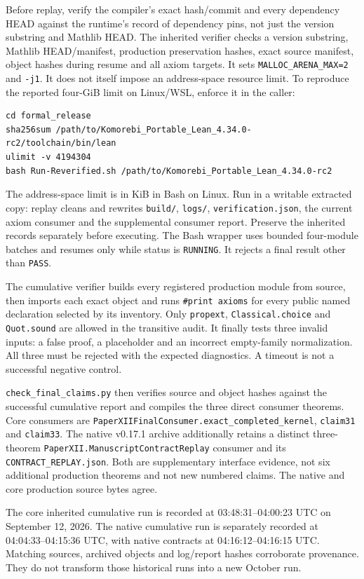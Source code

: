 \documentclass[11pt]{article}
\newcommand{\code}[1]{\nolinkurl{#1}}
\begin{document}
Before replay, verify the compiler's exact hash/commit and every dependency HEAD against the runtime's record of dependency pins, not just the version substring and Mathlib HEAD. The inherited verifier checks a version substring, Mathlib HEAD/manifest, production preservation hashes, exact source manifest, object hashes during resume and all axiom targets. It sets \code{MALLOC_ARENA_MAX=2} and \code{-j1}. It does not itself impose an address-space resource limit. To reproduce the reported four-GiB limit on Linux/WSL, enforce it in the caller:
\begin{Verbatim}[fontsize=\small,breaklines=true,breakanywhere=true,frame=lines]
cd formal_release
sha256sum /path/to/Komorebi_Portable_Lean_4.34.0-rc2/toolchain/bin/lean
ulimit -v 4194304
bash Run-Reverified.sh /path/to/Komorebi_Portable_Lean_4.34.0-rc2
\end{Verbatim}
The address-space limit is in KiB in Bash on Linux. Run in a writable extracted copy: replay cleans and rewrites \code{build/}, \code{logs/}, \code{verification.json}, the current axiom consumer and the supplemental consumer report. Preserve the inherited records separately before executing. The Bash wrapper uses bounded four-module batches and resumes only while status is \code{RUNNING}. It rejects a final result other than \code{PASS}.

The cumulative verifier builds every registered production module from source, then imports each exact object and runs \texttt{\#print axioms} for every public named declaration selected by its inventory. Only \code{propext}, \code{Classical.choice} and \code{Quot.sound} are allowed in the transitive audit. It finally tests three invalid inputs: a false proof, a placeholder and an incorrect empty-family normalization. All three must be rejected with the expected diagnostics. A timeout is not a successful negative control.

\code{check_final_claims.py} then verifies source and object hashes against the successful cumulative report and compiles the three direct consumer theorems. Core consumers are \code{PaperXIIFinalConsumer.exact_completed_kernel}, \code{claim31} and \code{claim33}. The native v0.17.1 archive additionally retains a distinct three-theorem \code{PaperXII.ManuscriptContractReplay} consumer and its \code{CONTRACT_REPLAY.json}. Both are supplementary interface evidence, not six additional production theorems and not new numbered claims. The native and core production source bytes agree.

The core inherited cumulative run is recorded at 03:48:31--04:00:23 UTC on September 12, 2026. The native cumulative run is separately recorded at 04:04:33--04:15:36 UTC, with native contracts at 04:16:12--04:16:15 UTC. Matching sources, archived objects and log/report hashes corroborate provenance. They do not transform those historical runs into a new October run.
\end{document}
